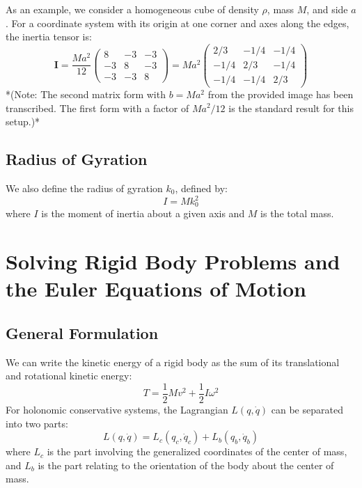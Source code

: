 \documentclass[12pt]{article}
\begin{document}
	As an example, we consider a homogeneous cube of density $\rho$, mass $M$, and side $a$. For a coordinate system with its origin at one corner and axes along the edges, the inertia tensor is:
	\[
	\mathbf{I} = \frac{Ma^2}{12}
	\begin{pmatrix}
		8 & -3 & -3 \\
		-3 & 8 & -3 \\
		-3 & -3 & 8
	\end{pmatrix}
	= Ma^2
	\begin{pmatrix}
		2/3 & -1/4 & -1/4 \\
		-1/4 & 2/3 & -1/4 \\
		-1/4 & -1/4 & 2/3
	\end{pmatrix}
	\]
	*(Note: The second matrix form with $b=Ma^2$ from the provided image has been transcribed. The first form with a factor of $Ma^2/12$ is the standard result for this setup.)*
	
	\subsection{Radius of Gyration}
	We also define the radius of gyration $k_0$, defined by:
	\[
	I = M k_0^2
	\]
	where $I$ is the moment of inertia about a given axis and $M$ is the total mass.
	
	\section{Solving Rigid Body Problems and the Euler Equations of Motion}
	
	\subsection{General Formulation}
	We can write the kinetic energy of a rigid body as the sum of its translational and rotational kinetic energy:
	$$
	T = \frac{1}{2} M v^2 + \frac{1}{2} I \omega^2
	$$
	For holonomic conservative systems, the Lagrangian $L(q, \dot{q})$ can be separated into two parts:
	$$
	L(q, \dot{q}) = L_c(q_c, \dot{q}_c) + L_b(q_b, \dot{q}_b)
	$$
	where $L_c$ is the part involving the generalized coordinates of the center of mass, and $L_b$ is the part relating to the orientation of the body about the center of mass.
	
\end{document}
